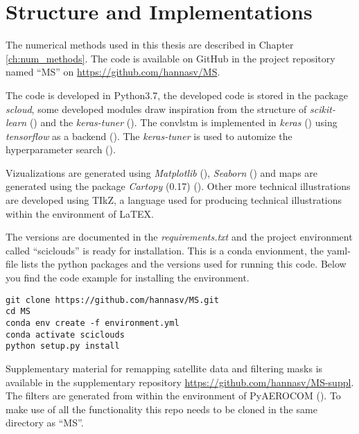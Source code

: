 \section{Structure and Implementations}
The numerical methods used in this thesis are described in Chapter \ref{ch:num_methods}. The code is available on GitHub in the project repository named ``MS'' on \href{https://github.com/hannasv/MS}{https://github.com/hannasv/MS}. 


The code is developed in Python3.7, the developed code is stored in the package \textit{scloud}, some developed modules draw inspiration from the structure of \textit{scikit-learn} (\cite{sklearn_api}) and the \textit{keras-tuner} (\cite{chollet2015kerastuner}). The \acrshort{convlstm} is implemented in \textit{keras} (\cite{chollet2015keras}) using \textit{tensorflow} as a backend (\cite{tensorflow2015}). The \textit{keras-tuner} is used to automize the hyperparameter search (\cite{chollet2015kerastuner}).

Vizualizations are generated using \textit{Matplotlib} (\cite{matplotlib}), \textit{Seaborn} (\cite{seaborn}) and maps are generated using the package \textit{Cartopy} (0.17) (\cite{Cartopy}). Other more technical illustrations are developed using TIkZ, a language used for producing technical illustrations within the environment of LaTEX.

The versions are documented in the \textit{requirements.txt} and the project environment called ``sciclouds'' is ready for installation. This is a conda envionment, the yaml-file lists the python packages and the versions used for running this code. Below you find the code example for installing the environment.

\begin{verbatim}
git clone https://github.com/hannasv/MS.git
cd MS
conda env create -f environment.yml
conda activate sciclouds
python setup.py install
\end{verbatim}

Supplementary material for remapping satellite data and filtering masks is available in the supplementary repository \href{https://github.com/hannasv/MS-suppl}{https://github.com/hannasv/MS-suppl}. The filters are generated from within the environment of PyAEROCOM (\cite{pyaerocom}). To make use of all the functionality this repo needs to be cloned in the same directory as ``MS''.


